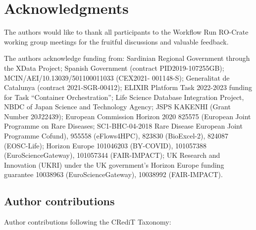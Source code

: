 \documentclass[10pt,letterpaper]{article}
\begin{document}
\section*{Acknowledgments}

The authors would like to thank all participants to the Workflow Run
RO-Crate working group meetings for the fruitful discussions and
valuable feedback.

The authors acknowledge funding from: 
  Sardinian Regional Government through the XData Project;
  Spanish Government (contract PID2019-107255GB);
  MCIN/AEI/10.13039/501100011033 (CEX2021- 001148-S);
  Generalitat de Catalunya (contract 2021-SGR-00412);
  ELIXIR Platform Task 2022-2023 funding for Task ``Container
  Orchestration'';
  Life Science Database Integration Project, NBDC of Japan Science and
  Technology Agency;
  JSPS KAKENHI (Grant Number 20J22439);
  European Commission Horizon 2020 
  825575 (European Joint Programme on Rare Diseases; SC1-BHC-04-2018 Rare Disease European Joint Programme Cofund),
  955558 (eFlows4HPC),
  823830
  (BioExcel-2), 
  824087
  (EOSC-Life);
  Horizon Europe 
  101046203 (BY-COVID),
  101057388 (EuroScienceGateway),
  101057344 (FAIR-IMPACT);
  UK Research and Innovation (UKRI) under the UK government's Horizon
  Europe funding guarantee 
  10038963 (EuroScienceGateway), 
  10038992 (FAIR-IMPACT).


\subsection*{Author contributions}
Author contributions following the CRediT Taxonomy:
\end{document}
